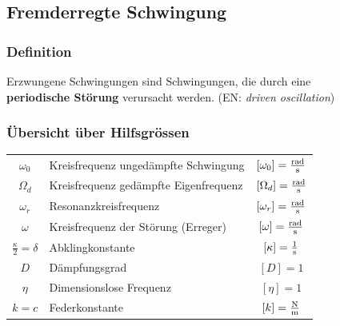 \vfill\null
\columnbreak


\subsection{Fremderregte Schwingung}

\subsubsection{Definition}

Erzwungene Schwingungen sind Schwingungen, die durch eine \\
\textbf{periodische Störung} verursacht werden. (EN: \textit{driven oscillation})

\subsubsection{Übersicht über Hilfsgrössen}


\begin{tabular}{c l c}
\rule{0pt}{10pt} $\omega_0$ & Kreisfrequenz ungedämpfte Schwingung & $[\omega_0] = \frac{\mathrm{rad}}{\mathrm{s}}$ \\
\rule{0pt}{10pt} $\Omega_d$ & Kreisfrequenz gedämpfte Eigenfrequenz & $[\Omega_d] = \frac{\mathrm{rad}}{\mathrm{s}}$ \\
\rule{0pt}{10pt} $\omega_r$ & Resonanzkreisfrequenz & $[\omega_r] = \frac{\mathrm{rad}}{\mathrm{s}}$ \\
\rule{0pt}{10pt} $\omega$ & Kreisfrequenz der Störung (Erreger) & $[\omega] = \frac{\mathrm{rad}}{\mathrm{s}}$ \\
\rule{0pt}{10pt} $\frac{\kappa}{2} = \delta $ & Abklingkonstante & $[\kappa] = \frac{1}{\mathrm{s}}$ \\
\rule{0pt}{10pt} $D$ & Dämpfungsgrad & $[D] = 1$ \\
$\eta$ & Dimensionslose Frequenz & $[\eta] = 1$  \\
$k = c$ & Federkonstante & $[k] = \frac{\mathrm{N}}{\mathrm{m}}$
\end{tabular}

